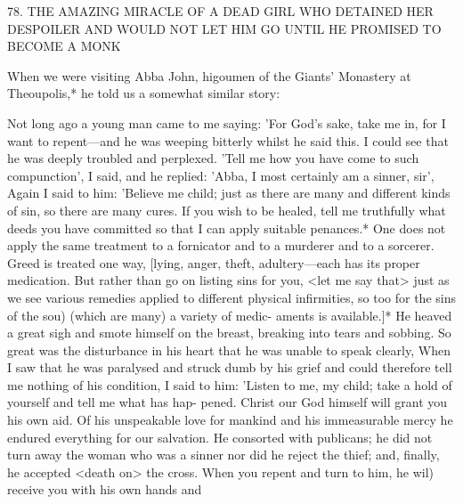 78.
THE AMAZING MIRACLE OF A DEAD GIRL
WHO DETAINED HER DESPOILER
AND WOULD NOT LET HIM GO
UNTIL HE PROMISED TO BECOME A MONK

When we were visiting Abba John, higoumen of the Giants'
Monastery at Theoupolis,* he told us a somewhat similar story:

Not long ago a young man came to me saying: 'For God's sake,
take me in, for I want to repent\textquotesingle —and he was weeping bitterly
whilst he said this.
I could see that he was deeply troubled and
perplexed.
'Tell me how you have come to such compunction', I
said, and he replied: 'Abba, I most certainly am a sinner, sir', Again
I said to him: 'Believe me child; just as there are many and different
kinds of sin, so there are many cures.
If you wish to be healed, tell
me truthfully what deeds you have committed so that I can apply
suitable penances.* One does not apply the same treatment to a
fornicator and to a murderer and to a sorcerer.
Greed is treated one
way, [lying, anger, theft, adultery—each has its proper medication.
But rather than go on listing sins for you, <let me say that> just as
we see various remedies applied to different physical infirmities, so
too for the sins of the sou) (which are many) a variety of medic-
aments is available.]* He heaved a great sigh and smote himself on
the breast, breaking into tears and sobbing.
So great was the
disturbance in his heart that he was unable to speak clearly, When
I saw that he was paralysed and struck dumb by his grief and could
therefore tell me nothing of his condition, I said to him: 'Listen to
me, my child; take a hold of yourself and tell me what has hap-
pened.
Christ our God himself will grant you his own aid.
Of his
unspeakable love for mankind and his immeasurable mercy he
endured everything for our salvation.
He consorted with publicans;
he did not turn away the woman who was a sinner nor did he reject
the thief; and, finally, he accepted <death on> the cross.
When you
repent and turn to him, he wil) receive you with his own hands and

